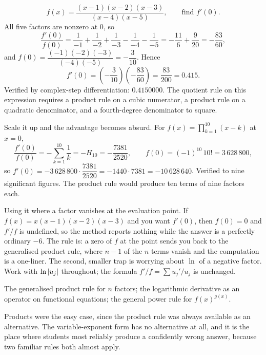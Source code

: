 \begin{worked}
\[
f(x)=\frac{(x-1)(x-2)(x-3)}{(x-4)(x-5)},\qquad \text{find } f'(0).
\]
All five factors are nonzero at $0$, so
\[
\frac{f'(0)}{f(0)}=\frac{1}{-1}+\frac{1}{-2}+\frac{1}{-3}-\frac{1}{-4}-\frac{1}{-5}=-\frac{11}{6}+\frac{9}{20}=-\frac{83}{60},
\]
and $f(0)=\dfrac{(-1)(-2)(-3)}{(-4)(-5)}=-\dfrac{3}{10}$. Hence
\[
f'(0)=\left(-\frac{3}{10}\right)\left(-\frac{83}{60}\right)=\frac{83}{200}=0.415 .
\]
Verified by complex-step differentiation: $0.4150000$. The quotient rule on this expression requires a product rule on a cubic numerator, a product rule on a quadratic denominator, and a fourth-degree denominator to square.

Scale it up and the advantage becomes absurd. For $f(x)=\prod_{k=1}^{10}(x-k)$ at $x=0$,
\[
\frac{f'(0)}{f(0)}=-\sum_{k=1}^{10}\frac1k=-H_{10}=-\frac{7381}{2520},\qquad f(0)=(-1)^{10}\,10!=3\,628\,800,
\]
so $f'(0)=-3\,628\,800\cdot\dfrac{7381}{2520}=-1440\cdot7381=-10\,628\,640$. Verified to nine significant figures. The product rule would produce ten terms of nine factors each.
\end{worked}

\begin{trap}
Using it where a factor vanishes at the evaluation point. If $f(x)=x(x-1)(x-2)(x-3)$ and you want $f'(0)$, then $f(0)=0$ and $f'/f$ is undefined, so the method reports nothing while the answer is a perfectly ordinary $-6$. The rule is: a zero of $f$ at the point sends you back to the generalised product rule, where $n-1$ of the $n$ terms vanish and the computation is a one-liner. The second, smaller trap is worrying about $\ln$ of a negative factor. Work with $\ln\left\lvert u_{j}\right\rvert$ throughout; the formula $f'/f=\sum u_{j}'/u_{j}$ is unchanged.
\end{trap}

\begin{seealsob}The generalised product rule for $n$ factors; the logarithmic derivative as an operator on functional equations; the general power rule for $f(x)^{g(x)}$.\end{seealsob}

Products were the easy case, since the product rule was always available as an alternative. The variable-exponent form has no alternative at all, and it is the place where students most reliably produce a confidently wrong answer, because two familiar rules both almost apply.

